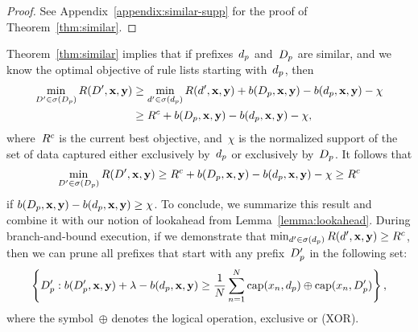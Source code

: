 \begin{arxiv}
\begin{proof}
See Appendix~\ref{appendix:similar-supp} for the proof of Theorem~\ref{thm:similar}.
\end{proof}

Theorem~\ref{thm:similar} implies that if prefixes~$d_p$
and~$D_p$ are similar, and we know the optimal objective
of rule lists starting with~$d_p$, then
\begin{align}
\min_{{D}' \in \sigma(D_p)} R({D}', \mathbf{x}, \mathbf{y})
&\ge \min_{{d}' \in \sigma(d_p)} R({d}', \mathbf{x}, \mathbf{y})
+ b(D_p, \mathbf{x}, \mathbf{y}) - b(d_p, \mathbf{x}, \mathbf{y}) - \chi \nonumber \\
&\ge {R^c} + b(D_p, \mathbf{x}, \mathbf{y}) - b(d_p, \mathbf{x}, \mathbf{y}) - \chi,
\end{align}
where~${R^c}$ is the current best objective,
and~$\chi$ is the normalized support of the set of data captured
either exclusively by~$d_p$ or exclusively by~$D_p$.
%
It follows that
\begin{align}
\min_{{D}' \in \sigma(D_p)} R({D}', \mathbf{x}, \mathbf{y})
\ge {R^c} + b(D_p, \mathbf{x}, \mathbf{y}) - b(d_p, \mathbf{x}, \mathbf{y}) - \chi \ge {R^c}
\end{align}
if ${b(D_p, \mathbf{x}, \mathbf{y}) - b(d_p, \mathbf{x}, \mathbf{y}) \ge \chi}$.
%
To conclude, we summarize this result and combine it with
our notion of lookahead from Lemma~\ref{lemma:lookahead}.
%
During branch-and-bound execution, if we demonstrate that
${\min_{{d}' \in \sigma(d_p)} R({d}', \mathbf{x}, \mathbf{y}) \ge {R^c}}$,
then we can prune all prefixes that start with any
prefix~$D_p'$ in the following set:
\begin{align}
\left\{ D_p' : b(D_p', \mathbf{x}, \mathbf{y}) + {\lambda} - b(d_p, \mathbf{x}, \mathbf{y}) \ge
\frac{1}{N} \sum_{n=1}^N \textnormal{cap}(x_n, d_p) \oplus \textnormal{cap}(x_n, D_p') \right\},
\end{align}
where the symbol~$\oplus$ denotes the logical operation, exclusive or (XOR).


\end{arxiv}
